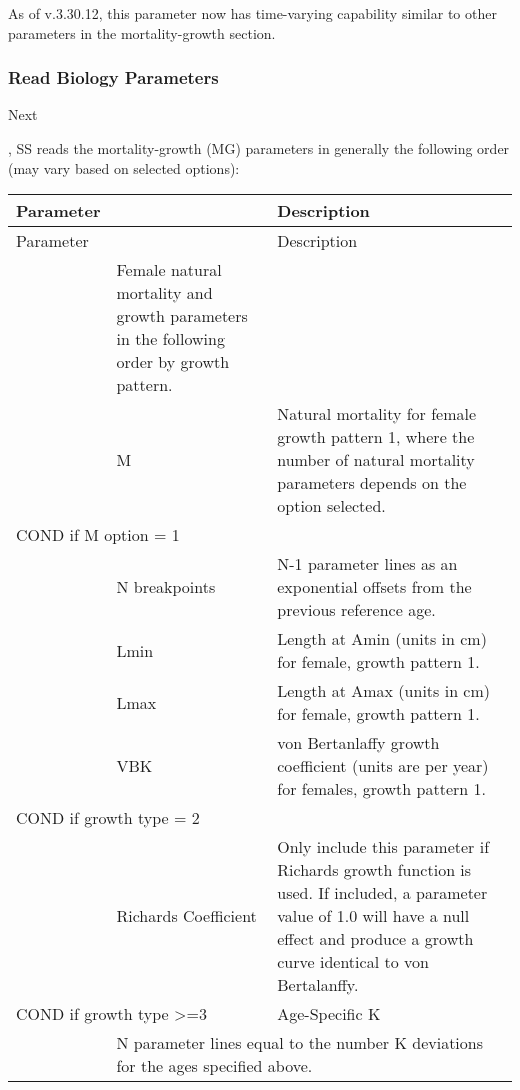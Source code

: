 As of v.3.30.12, this parameter now has time-varying capability similar to other parameters in the mortality-growth section.

\subsubsection{Read Biology Parameters}
\hypertarget{MGorder}{Next}, SS reads the mortality-growth (MG) parameters in generally the following order (may vary based on selected options):

\begin{longtable}{p{1cm} p{2.25cm} p{10cm}}
	\hline
	Parameter& & Description\Tstrut\Bstrut\\
	\hline
	\endfirsthead

	\hline
	Parameter& & Description\Tstrut\Bstrut\\
	\hline
	\endhead

	\hline
	\endfoot

	\endlastfoot

	\multicolumn{2}{l}{Females}\Tstrut & Female natural mortality and growth parameters in the following order by growth pattern.\\
	& M & Natural mortality for female growth pattern 1, where the number of natural mortality parameters depends on the option selected.\Bstrut\\
	\hline
	\multicolumn{2}{l}{COND if M option = 1 } & \Tstrut\\
	& N breakpoints & N-1 parameter lines as an exponential offsets from the previous reference age.\Bstrut\\
	\hline

	& Lmin & Length at Amin (units in cm) for female, growth pattern 1. \\
	& Lmax & Length at Amax (units in cm) for female, growth pattern 1. \\
	& VBK & von Bertanlaffy growth coefficient (units are per year) for females, growth pattern 1.\Bstrut\\
	\hline

	\multicolumn{2}{l}{COND if growth type = 2 } & \Tstrut\\
	& Richards Coefficient & Only include this parameter if Richards growth function is used.  If included, a parameter value of 1.0 will have a null effect and produce a growth curve identical to von Bertalanffy.\\

	\multicolumn{2}{l}{COND if growth type >=3 } & Age-Specific K\\
	& \multicolumn{2}{l}{N parameter lines equal to the number K deviations for the ages specified above.}\Bstrut\\
	\hline


\end{longtable}
